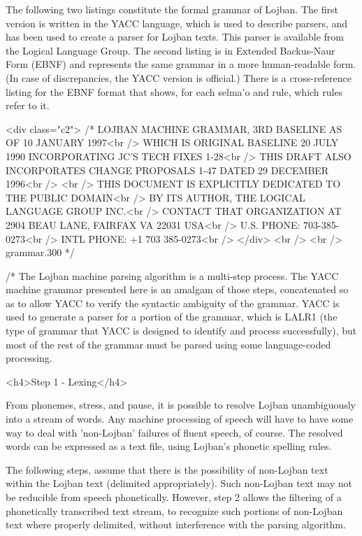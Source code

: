 The following two listings constitute the formal grammar of
    Lojban. The first version is written in the YACC language,
    which is used to describe parsers, and has been used to create
    a parser for Lojban texts. This parser is available from the
    Logical Language Group. The second listing is in Extended
    Backus-Naur Form (EBNF) and represents the same grammar in a
    more human-readable form. (In case of discrepancies, the YACC
    version is official.) There is a cross-reference listing for
    the EBNF format that shows, for each selma'o and rule, which
    rules refer to it.



<div class="c2">
      /* LOJBAN MACHINE GRAMMAR, 3RD BASELINE AS OF 10 JANUARY
      1997<br />
       WHICH IS ORIGINAL BASELINE 20 JULY 1990 INCORPORATING JC'S
      TECH FIXES 1-28<br />
       THIS DRAFT ALSO INCORPORATES CHANGE PROPOSALS 1-47 DATED 29
      DECEMBER 1996<br />
      <br />
       THIS DOCUMENT IS EXPLICITLY DEDICATED TO THE PUBLIC
      DOMAIN<br />
       BY ITS AUTHOR, THE LOGICAL LANGUAGE GROUP INC.<br />
       CONTACT THAT ORGANIZATION AT 2904 BEAU LANE, FAIRFAX VA
      22031 USA<br />
       U.S. PHONE: 703-385-0273<br />
       INTL PHONE: +1 703 385-0273<br />
    </div>
    <br />
    <br />
     grammar.300 */ 

/* The Lojban machine parsing algorithm is a multi-step
    process. The YACC machine grammar presented here is an amalgam
    of those steps, concatenated so as to allow YACC to verify the
    syntactic ambiguity of the grammar. YACC is used to generate a
    parser for a portion of the grammar, which is LALR1 (the type
    of grammar that YACC is designed to identify and process
    successfully), but most of the rest of the grammar must be
    parsed using some language-coded processing.

<h4>Step 1 - Lexing</h4>

From phonemes, stress, and pause, it is possible to resolve
    Lojban unambiguously into a stream of words. Any machine
    processing of speech will have to have some way to deal with
    'non-Lojban' failures of fluent speech, of course. The resolved
    words can be expressed as a text file, using Lojban's phonetic
    spelling rules.

The following steps, assume that there is the possibility of
    non-Lojban text within the Lojban text (delimited
    appropriately). Such non-Lojban text may not be reducible from
    speech phonetically. However, step 2 allows the filtering of a
    phonetically transcribed text stream, to recognize such
    portions of non-Lojban text where properly delimited, without
    interference with the parsing algorithm.


